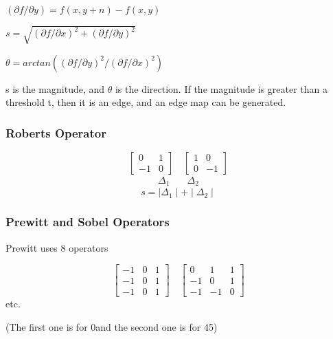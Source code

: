 \documentclass{article}
\begin{document}
\begin{multicols}{2}
$(\partial f/\partial y) = f(x, y+n) - f(x,y)$

$s = \sqrt{(\partial f/\partial x)^2 + (\partial f/\partial y)^2}$

$\theta = arctan((\partial f/\partial y)^2/(\partial f/\partial x)^2)$

s is the magnitude, and $\theta$ is the direction.
If the magnitude is greater than a threshold t, then it is an edge, and an edge map can be generated.

\subsubsection{Roberts Operator}

        \[
          \begin{bmatrix}
            0 & 1\\
            -1 & 0
          \end{bmatrix}\quad
          \begin{bmatrix}
            1 & 0\\
            0 & -1
          \end{bmatrix}
        \]
        \[
          \begin{matrix}
            \Delta_1
          \end{matrix}\quad
          \begin{matrix}
            \Delta_2
          \end{matrix}
        \]
\[s = \mid\Delta_1\mid + \mid\Delta_2\mid\]

\subsubsection{Prewitt and Sobel Operators}

Prewitt uses 8 operators

        \[
          \begin{bmatrix}
            -1 & 0 & 1\\
            -1 & 0 & 1\\
            -1 & 0 & 1
          \end{bmatrix}\quad
          \begin{bmatrix}
            0 & 1 & 1\\
            -1 & 0 & 1\\
            -1 & -1 & 0
          \end{bmatrix}
        \]
etc.

(The first one is for 0\textdegree and the second one is for 45\textdegree)


\end{multicols}
\end{document}
